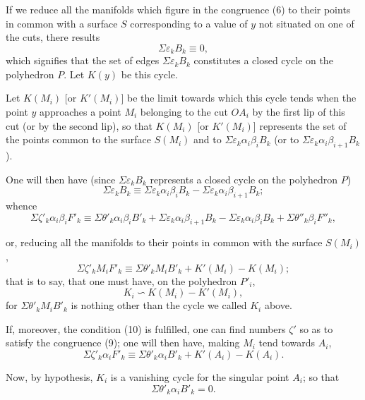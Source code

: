 \documentclass{article}
\begin{document}
If we reduce all the manifolds which figure in the congruence (6) to their points in common with a surface $S$ corresponding to a value of $y$ not situated on one of the cuts, there results
\[ \Sigma \varepsilon_{k} B_{k} \equiv 0, \]
which signifies that the set of edges $\Sigma \varepsilon_{k} B_{k}$ constitutes a closed cycle on the polyhedron $P$. Let $K(y)$ be this cycle.

Let $K(M_{i})$ [or $K'(M_{i})$] be the limit towards which this cycle tends when the point $y$ approaches a point $M_{i}$ belonging to the cut $OA_{i}$ by the first lip of this cut (or by the second lip), so that $K(M_{i})$ [or $K'(M_{i})$] represents the set of the points common to the surface $S(M_{i})$ and to $\Sigma \varepsilon_{k} \alpha_{i}\beta_{i}B_{k}$ (or to $\Sigma \varepsilon_{k} \alpha_{i}\beta_{i+1}B_{k}$).

One will then have (since $\Sigma \varepsilon_{k} B_{k}$ represents a closed cycle on the polyhedron $P$)
\[ \Sigma \varepsilon_{k} B_{k} \equiv \Sigma \varepsilon_{k} \alpha_{i}\beta_{i}B_{k} - \Sigma \varepsilon_{k} \alpha_{i}\beta_{i+1}B_{k}; \tag{7} \]
whence
\[ \Sigma \zeta'_{k} \alpha_{i}\beta_{i}F'_{k} \equiv \Sigma \theta'_{k} \alpha_{i}\beta_{i}B'_{k} + \Sigma \varepsilon_{k} \alpha_{i}\beta_{i+1}B_{k} - \Sigma \varepsilon_{k} \alpha_{i}\beta_{i}B_{k} + \Sigma \theta''_{k} \beta_{i}F''_{k}, \tag{8} \]

or, reducing all the manifolds to their points in common with the surface $S(M_{i})$,
\[ \Sigma \zeta'_{k} M_{i}F'_{k} \equiv \Sigma \theta'_{k} M_{i}B'_{k} + K'(M_{i}) - K(M_{i}); \tag{9} \]
that is to say, that one must have, on the polyhedron $P'_{i}$,
\[ K_{i} \backsim K(M_{i}) - K'(M_{i}), \tag{10} \]
for $\Sigma \theta'_{k} M_{i}B'_{k}$ is nothing other than the cycle we called $K_{i}$ above.

If, moreover, the condition (10) is fulfilled, one can find numbers $\zeta'$ so as to satisfy the congruence (9); one will then have, making $M_{i}$ tend towards $A_{i}$,
\[ \Sigma \zeta'_{k} \alpha_{i}F'_{k} \equiv \Sigma \theta'_{k} \alpha_{i}B'_{k} + K'(A_{i}) - K(A_{i}). \]

Now, by hypothesis, $K_{i}$ is a vanishing cycle for the singular point $A_{i}$; so that
\[ \Sigma \theta'_{k} \alpha_{i}B'_{k} = 0. \]
\end{document}
